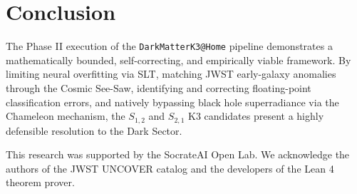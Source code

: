 \documentclass[aps,prd,twocolumn,nofootinbib,superscriptaddress,10pt]{revtex4-2}
\begin{document}
\section{Conclusion}

The Phase II execution of the \texttt{DarkMatterK3@Home} pipeline demonstrates a mathematically bounded, self-correcting, and empirically viable framework. By limiting neural overfitting via SLT, matching JWST early-galaxy anomalies through the Cosmic See-Saw, identifying and correcting floating-point classification errors, and natively bypassing black hole superradiance via the Chameleon mechanism, the $S_{1,2}$ and $S_{2,1}$ K3 candidates present a highly defensible resolution to the Dark Sector.

\begin{acknowledgments}
This research was supported by the SocrateAI Open Lab. We acknowledge the authors of the JWST UNCOVER catalog and the developers of the Lean 4 theorem prover.
\end{acknowledgments}
\end{document}
